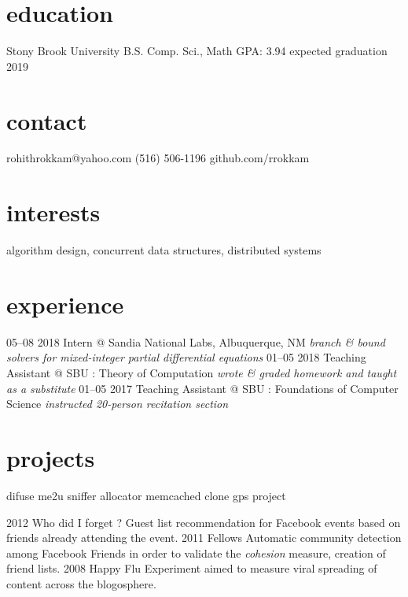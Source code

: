 \documentclass{cv}
\begin{document}

\begin{aside}
  \section{education}
    Stony Brook University
    B.S. Comp. Sci., Math
    GPA: 3.94
    expected graduation 2019
  \section{contact}
    rohithrokkam@yahoo.com
    (516) 506-1196
    github.com/rrokkam
\end{aside}

\section{interests}

algorithm design, concurrent data structures, distributed systems

\section{experience}

\begin{entrylist}
  \entry
    {05–08 2018}
    {Intern @ Sandia National Labs, Albuquerque, NM}
    {\emph{branch \& bound solvers for mixed-integer partial differential equations}}
  \entry
    {01–05 2018}
    {Teaching Assistant @ SBU : Theory of Computation}
    {\emph{wrote \& graded homework and taught as a substitute}}
  \entry
    {01–05 2017}
    {Teaching Assistant @ SBU : Foundations of Computer Science}
    {\emph{instructed 20-person recitation section}}
\end{entrylist}

\section{projects}

difuse
me2u
sniffer
allocator
memcached clone
gps project


\begin{entrylist}
  \entry
    {2012}
    {Who did I forget ?}
    {Guest list recommendation for Facebook events based on friends already attending the event.}
  \entry
    {2011}
    {Fellows}
    {Automatic community detection among Facebook Friends in order to validate the \emph{cohesion} measure, creation of friend lists.}
  \entry
    {2008}
    {Happy Flu}
    {Experiment aimed to measure viral spreading of content across the blogosphere.}
\end{entrylist}
\end{document}
